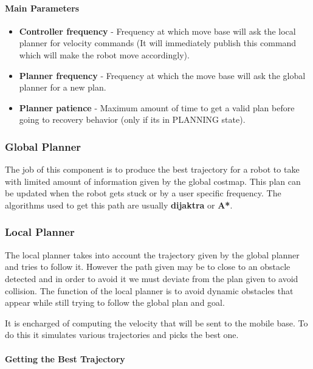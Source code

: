\documentclass[12pt]{article}
\begin{document}
\paragraph{Main Parameters}
\begin{itemize}[label={}]
    \item \textbf{Controller frequency} - Frequency at which move base will ask the local planner for velocity commands (It will immediately publish this command which will make the robot move accordingly).
    \item \textbf{Planner frequency} - Frequency at which the move base will ask the global planner for a new plan.
    \item \textbf{Planner patience} - Maximum amount of time to get a valid plan before going to recovery behavior (only if its in PLANNING state).
\end{itemize}

\subsubsection{Global Planner}
The job of this component is to produce the best trajectory for a robot to take with limited amount of information given by the global costmap. This plan can be updated when the robot gets stuck or by a user specific frequency. The algorithms used to get this path are usually \textbf{dijaktra} or \textbf{A*}. 
\subsubsection{Local Planner}
The local planner takes into account the trajectory given by the global planner and tries to follow it. However the path given may be to close to an obstacle detected and in order to avoid it we must deviate from the plan given to avoid collision. The function of the local planner is to avoid dynamic obstacles that appear while still trying to follow the global plan and goal. 

It is encharged of computing the velocity that will be sent to the mobile base. To do this it simulates various trajectories and picks the best one.

\paragraph{Getting the Best Trajectory}
\end{document}
